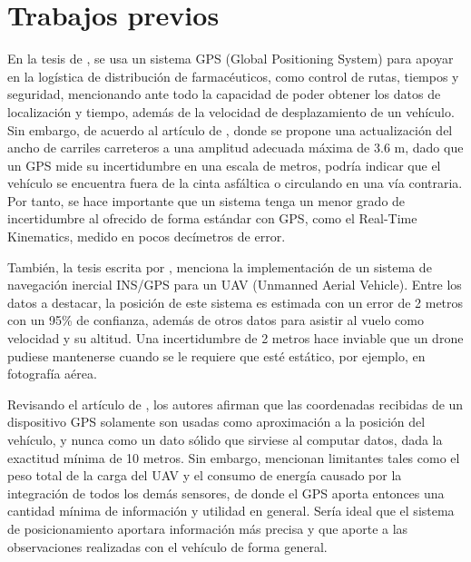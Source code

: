 \section{Trabajos previos}
En la tesis de \cite{de2011diseno}, se usa un sistema GPS (Global Positioning System\footnotemark) para apoyar en la logística de distribución de farmacéuticos, como control de rutas, tiempos y seguridad, mencionando ante todo la capacidad de poder obtener los datos de localización y tiempo, además de la velocidad de desplazamiento de un vehículo. Sin embargo, de acuerdo al artículo de \cite{mendoza2004recomendaciones}, donde se propone una actualización del ancho de carriles carreteros a una amplitud adecuada máxima de 3.6 m, dado que un GPS mide su incertidumbre en una escala de metros, podría indicar que el vehículo se encuentra fuera de la cinta asfáltica o circulando en una vía contraria. Por tanto, se hace importante que un sistema tenga un menor grado de incertidumbre al ofrecido de forma estándar con GPS, como el Real-Time Kinematics, medido en pocos decímetros de error. \\


También, la tesis escrita por \cite{ronnback2000developement}, menciona la implementación de un sistema de navegación inercial INS/GPS para un UAV (Unmanned Aerial Vehicle\footnotemark). Entre los datos a destacar, la posición de este sistema es estimada con un error de 2 metros con un 95\% de confianza, además de otros datos para asistir al vuelo como velocidad y su altitud. Una incertidumbre de 2 metros hace inviable que un drone pudiese mantenerse cuando se le requiere que esté estático, por ejemplo, en fotografía aérea.\\


Revisando el artículo de \cite{maldonado2010controlador}, los autores afirman que las coordenadas recibidas de un dispositivo GPS solamente son usadas como aproximación a la posición del vehículo, y nunca como un dato sólido que sirviese al computar datos, dada la exactitud mínima de 10 metros. Sin embargo, mencionan limitantes tales como el peso total de la carga del UAV y el consumo de energía causado por la integración de todos los demás sensores, de donde el GPS aporta entonces una cantidad mínima de información y utilidad en general. Sería ideal que el sistema de posicionamiento aportara información más precisa y que aporte a las observaciones realizadas con el vehículo de forma general.\\


